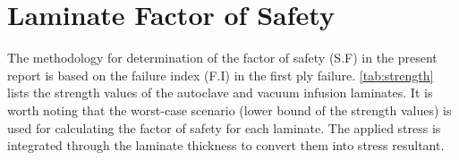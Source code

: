 \documentclass{article}
\begin{document}
\section{Laminate Factor of Safety}\label{sec:failure}
The methodology for determination of the factor of safety (S.F) in the present report is based on the failure index (F.I) in the first ply failure. \cref{tab:strength} lists the strength values of the autoclave and vacuum infusion laminates. It is worth noting that the worst-case scenario (lower bound of the strength values) is used for calculating the factor of safety for each laminate. The applied stress is integrated through the laminate thickness to convert them into stress resultant.

\begin{table}[H]
    \caption{Strength values of the autoclave and vacuum infusion laminates in different directions.}
    \label{tab:strength}
\end{table}
\end{document}
